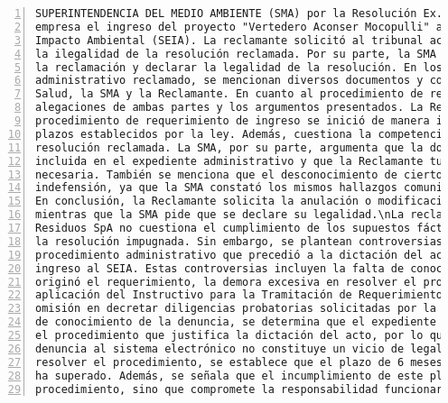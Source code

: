 \begin{Verbatim}[frame=lines, label=Elavoración propia -  Ejemplo de Contexto enviado por el Chatbot a OpenAI
				, fontsize=\footnotesize, numbers=left
				, baselinestretch=0.4
				, formatcom=\color{gray}]
SUPERINTENDENCIA DEL MEDIO AMBIENTE (SMA) por la Resolución Ex. N° 427, que requería a la
empresa el ingreso del proyecto "Vertedero Aconser Mocopulli" al Sistema de Evaluación de
Impacto Ambiental (SEIA). La reclamante solicitó al tribunal acoger su reclamación y declarar
la ilegalidad de la resolución reclamada. Por su parte, la SMA solicitó al tribunal rechazar
la reclamación y declarar la legalidad de la resolución. En los antecedentes del acto
administrativo reclamado, se mencionan diversos documentos y comunicaciones entre la SEREMI de
Salud, la SMA y la Reclamante. En cuanto al procedimiento de reclamación, se detallan las
alegaciones de ambas partes y los argumentos presentados. La Reclamante argumenta que el
procedimiento de requerimiento de ingreso se inició de manera irregular y que se violaron
plazos establecidos por la ley. Además, cuestiona la competencia de la SMA para dictar la
resolución reclamada. La SMA, por su parte, argumenta que la documentación relevante está
incluida en el expediente administrativo y que la Reclamante tuvo acceso a la información
necesaria. También se menciona que el desconocimiento de ciertos documentos no supone
indefensión, ya que la SMA constató los mismos hallazgos comunicados por la SEREMI de Salud.
En conclusión, la Reclamante solicita la anulación o modificación de la resolución reclamada,
mientras que la SMA pide que se declare su legalidad.\nLa reclamación presentada por ACONSER
Residuos SpA no cuestiona el cumplimiento de los supuestos fácticos y jurídicos contenidos en
la resolución impugnada. Sin embargo, se plantean controversias relacionadas con el
procedimiento administrativo que precedió a la dictación del acto terminal de requerimiento de
ingreso al SEIA. Estas controversias incluyen la falta de conocimiento de la denuncia que
originó el requerimiento, la demora excesiva en resolver el procedimiento, la omisión en la
aplicación del Instructivo para la Tramitación de Requerimientos de Ingreso al SEIA y la
omisión en decretar diligencias probatorias solicitadas por la interesada. Respecto a la falta
de conocimiento de la denuncia, se determina que el expediente administrativo físico contiene
el procedimiento que justifica la dictación del acto, por lo que la tardanza en incorporar la
denuncia al sistema electrónico no constituye un vicio de legalidad. En cuanto a la demora en
resolver el procedimiento, se establece que el plazo de 6 meses establecido por la ley no se
ha superado. Además, se señala que el incumplimiento de este plazo no afecta la validez del
procedimiento, sino que compromete la responsabilidad funcionaria. En relación a la omisión en

\end{Verbatim}
